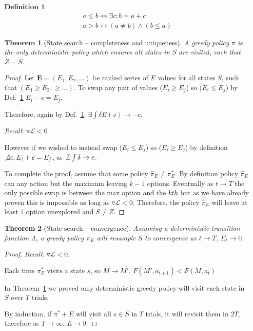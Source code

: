 \documentclass[9pt,twocolumn,twoside]{pnas-new}
\newtheorem{theorem}{Theorem}
\newtheorem{definition}{Definition}
\begin{document}
\begin{definition} \label{def:ineq}
    \begin{align}
        a \leq b \Leftrightarrow \exists c; b = a + c \\
        a > b \leftrightarrow (a \neq b) \wedge (b \leq a) 
    \end{align}
\end{definition}



\begin{theorem}[State search -- completeness and uniqueness] \label{theorem:Z}
A greedy policy $\pi$ is the only deterministic policy which ensures all states in $S$ are visited, such that $Z = S$.
\end{theorem}
\begin{proof}    
    Let $\textbf{E} = (E_1, E_2, ...)$ be ranked series of $E$ values for all states $S$, such that $(E_1 \geq E_2, \geq ...)$. To swap any pair of values ($E_i \geq E_j$) so ($E_i \leq E_j$) by Def.~\ref{def:ineq} $E_i - c = E_j$.  

    Therefore, again by Def.~\ref{def:ineq}, $\exists \int \delta E(s) \rightarrow -c$. 

    \textit{Recall}: $\triangledown \mathcal{L} < 0$

    However if we wished to instead swap ($E_i \leq E_j$) so ($E_i \geq E_j$) by definition $\not \exists c; E_i + c = E_j$, as $\not \exists \int \delta \rightarrow c$. 

    To complete the proof, assume that some policy $\hat \pi_E \neq \pi^*_E$. By definition policy $\hat \pi_E$ can any action but the maximum leaving $k-1$ options. Eventually as $t \rightarrow T$ the only possible swap is between the max option and the $kth$ but as we have already proven this is impossible as long as $\triangledown \mathcal{L} < 0$. Therefore, the policy $\hat \pi_E$ will leave at least 1 option unexplored and $S \neq Z$.
\end{proof}

\begin{theorem}[State search -- convergence] \label{theorem:convergence}
    Assuming a deterministic transition function $\Lambda$, a greedy policy $\pi_E$ will resample $S$ to convergence as $t \rightarrow T$, $E_t \rightarrow 0$.
\end{theorem}
\begin{proof}
    \textit{Recall}: $\triangledown \mathcal{L} < 0$. 

    Each time $\pi^*_E$ visits a state $s$, so $M \rightarrow M'$, $F(M', a_{t+1}) < F(M, a_t)$

    In Theorem~\ref{theorem:Z} we proved only deterministic greedy policy will visit each state in $S$ over $T$ trials.
    
    By induction, if $\pi^*+E$ will visit all $s \in S$ in $T$ trials, it will revisit them in $2T$, therefore as $T \rightarrow \infty$, $E \rightarrow 0$. 
\end{proof}
\end{document}

